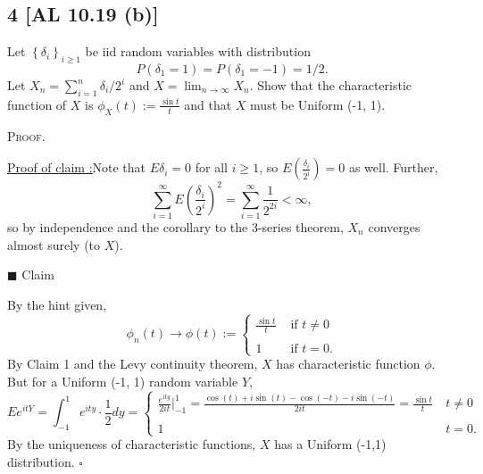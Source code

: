 \documentclass[12pt]{article}
\newcounter{ProofCounter}
\newcounter{ClaimCounter}[ProofCounter]
\newenvironment{Proof}{\stepcounter{ProofCounter}\textsc{Proof.}}{\hfill$\square$}
\newenvironment{claim}[1]{\vspace{1mm}\stepcounter{ClaimCounter}\par\noindent\underline{\bf Claim \theClaimCounter:}\space#1}{}
\newenvironment{claimproof}[1]{\par\noindent\underline{Proof of claim \theClaimCounter:}\space#1}{\hfill $\blacksquare$ Claim \theClaimCounter}
\begin{document}
\newpage 
\subsection*{4 [AL 10.19 (b)]}
\begin{tcolorbox}
  Let $\left\{ \delta_i \right\}_{i\geq 1}$ be iid random variables with distribution 
  \[ P(\delta_1 = 1) = P(\delta_1 = -1) = 1/2. \]
  Let $X_n = \sum_{i=1}^{n}\delta_i / 2^{i}$ and $X = \lim_{n\rightarrow\infty}X_n$. Show that the characteristic function of $X$ is $\phi_X(t) :=
  \frac{\sin t}{t}$ and that $X$ must be Uniform (-1, 1).
\end{tcolorbox}
\begin{Proof}
  \begin{claimproof}
    Note that $E\delta_i = 0$ for all $i \geq 1$, so $E\left(\frac{\delta_i}{2^{i}}\right) = 0$ as well. Further,
    \[ \sum_{i=1}^{\infty}E\left( \frac{\delta_i}{2^{i}} \right)^{2} = \sum_{i=1}^{\infty}\frac{1}{2^{2i}} < \infty, \]
    so by independence and the corollary to the 3-series theorem, $X_n$ converges almost surely (to $X$).

  \end{claimproof}

  By the hint given,
  \[ 
    \phi_n(t) \rightarrow \phi(t) := \left\{ \begin{array}{cl}
        \frac{\sin t}{t} & \text{ if } t \neq 0 \\
        \\
        1 & \text{ if } t = 0.
    \end{array} \right.
  \]
  By Claim 1 and the Levy continuity theorem, $X$ has characteristic function $\phi$. But for a Uniform (-1, 1) random variable $Y$,
  \[ 
    Ee^{itY} = \int_{-1}^{1}e^{ity}\cdot \frac{1}{2} dy = \left\{ \begin{array}{cl}
        \frac{e^{ity}}{2it}\bigg|_{-1}^{1} = \frac{\cos(t) + i\sin(t) - \cos(-t) - i\sin(-t)}{2it} = \frac{\sin t}{t} & \ t \neq 0 \\
        \\
        1 & \ t = 0.
    \end{array} \right.
  \]
  By the uniqueness of characteristic functions, $X$ has a Uniform (-1,1) distribution.
\end{Proof}
\end{document}
